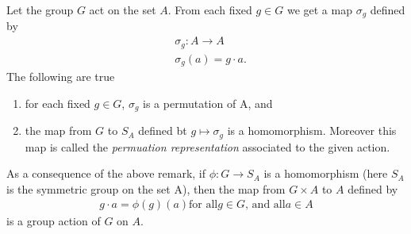 \documentclass[../main]{subfiles}
\begin{document}
 
 \begin{nt}
  Let the group $G$ act on the set $A$. From each fixed $g\in G$ we get a map $\sigma_g$ defined by 
  \begin{align*}
   &\sigma_g \colon A \to A \\
   &\sigma_g(a)=g\cdot a.
  \end{align*}
  The following are true
  \begin{enumerate}
   \item for each fixed $g\in G$, $\sigma_g$ is a permutation of A, and 
   \item the map from $G$ to $S_A$ defined bt $g\mapsto \sigma_g$ is a homomorphism. Moreover this map is called the \textit{permuation representation} associated to the given action. 
  \end{enumerate}
 \end{nt}

 \begin{nt}
  As a consequence of the above remark, if $\phi \colon G \to S_A$ is a homomorphism (here $S_A$ is the symmetric group on the set A), then the map from $G\times A$ to $ A$ defined by 
  \begin{align*}
   g\cdot a = \phi(g)(a) \text{for all} g\in G \text{, and all} a\in A
  \end{align*}
  is a group action of $G$ on $A$.
 \end{nt}

 
\end{document}
